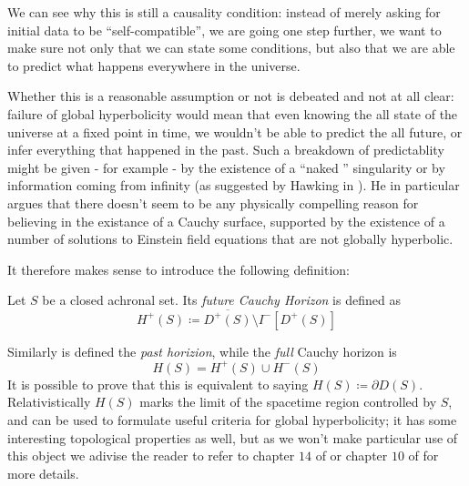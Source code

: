 We can see why this is still a causality condition: instead of merely asking for initial data to be ``self-compatible'', we are going one step further, we want to make sure not only that we can state some conditions, but also that we are able to predict what happens everywhere in the universe. 

Whether this is a reasonable assumption or not is debeated and not at all clear: failure of global hyperbolicity would mean that even knowing the all state of the universe at a fixed point in time, we wouldn't be able to predict the all future, or infer everything that happened in the past. Such a breakdown of predictablity might be given - for example - by the existence of a ``naked '' singularity or by information coming from infinity (as suggested by Hawking in \cite{hawking1973large}). He in particular argues that there doesn't seem to be any physically compelling reason for believing in the existance of a Cauchy surface, supported by the existence of a number of solutions to Einstein field equations that are not globally hyperbolic.

It therefore makes sense to introduce the following definition:
\begin{definition}
	Let \(S\) be a closed achronal set. Its \emph{future Cauchy Horizon} is defined as 
	\[
	H^+(S) \coloneqq \overline{D^+(S)} \setminus I^-[D^+(S)]	
	\]
\end{definition}
	Similarly is defined the \emph{past horizion}, while the \emph{full} Cauchy horizon is
	\[
	H(S) = 	H^+(S) \cup H^-(S)
	\]
	It is possible to prove that this is equivalent to saying \(H(S) \coloneqq \partial D(S)\). Relativistically \(H(S)\) marks the limit of the spacetime region controlled by \(S\), and can be used to formulate useful criteria for global hyperbolicity; it has some interesting topological properties as well, but as we won't make particular use of this object we adivise the reader to refer to chapter \(14\) of \cite{o1983semi} or chapter \(10\) of \cite{wald2010general} for more details.